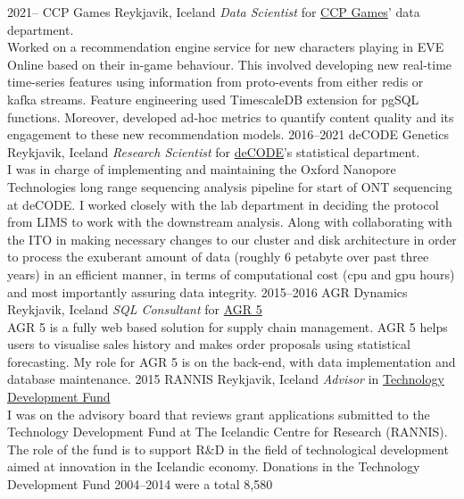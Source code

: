 \documentclass[]{cv} %
\begin{document}
\begin{entrylist}
\entry
{2021--}
{CCP Games}
{Reykjavik, Iceland}
{\emph{Data Scientist} for
	\href{https://www.ccpgames.com/}{CCP Games}' data department.\\
	Worked on a recommendation engine service for new characters playing in EVE Online based on their in-game behaviour. This involved developing new real-time time-series features using information from proto-events from either redis or kafka streams. Feature engineering used TimescaleDB extension for pgSQL functions. Moreover, developed ad-hoc metrics to quantify content quality and its engagement to these new recommendation models.
}
\entry
{2016--2021}
{deCODE Genetics}
{Reykjavik, Iceland}
{\emph{Research Scientist} for
    \href{https://www.decode.com/}{deCODE}'s statistical department.\\
    I was in charge of implementing and maintaining the Oxford Nanopore Technologies long range sequencing analysis pipeline for start of ONT sequencing at deCODE. 
    I worked closely with the lab department in deciding the protocol from LIMS to work with the downstream analysis. Along with collaborating with the ITO in making necessary changes to our cluster and disk architecture in order to process the exuberant amount of data (roughly 6 petabyte over past three years) in an efficient manner, in terms of computational cost (cpu and gpu hours) and most importantly assuring data integrity. 
}
\entry
{2015--2016}
{AGR Dynamics}
{Reykjavik, Iceland}
{\emph{SQL Consultant} for
    \href{http://agrdynamics.com/}{AGR 5}\\
    AGR 5 is a fully web based solution for supply chain management. AGR 5 
    helps users to visualise sales history and makes order proposals using 
    statistical forecasting. My role for AGR 5 is on the back-end, with data 
    implementation and database maintenance.
}    
\entry
{2015}
{RANNIS}
{Reykjavik, Iceland}
{\emph{Advisor} in 
\href{http://www.rannis.is/sjodir/rannsoknir/taeknithrounarsjodur/fagrad/}{Technology
 Development Fund}\\
I was on the advisory board that reviews grant applications submitted to 
the  Technology Development Fund at The Icelandic Centre for Research (RANNIS).
The role of the fund is to support R$\&$D in the field of technological 
development aimed at innovation in the Icelandic economy.
Donations in the Technology Development Fund 2004--2014 were a total 8,580 
}
\end{entrylist}
\end{document}
